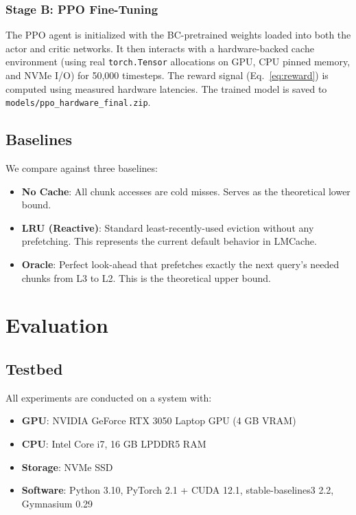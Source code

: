\documentclass[conference]{IEEEtran}
\begin{document}
\subsubsection{Stage B: PPO Fine-Tuning}

The PPO agent is initialized with the BC-pretrained weights loaded into both the actor and critic networks. It then interacts with a hardware-backed cache environment (using real \texttt{torch.Tensor} allocations on GPU, CPU pinned memory, and NVMe I/O) for 50,000 timesteps. The reward signal (Eq.~\ref{eq:reward}) is computed using measured hardware latencies. The trained model is saved to \texttt{models/ppo\_hardware\_final.zip}.

\subsection{Baselines}

We compare against three baselines:

\begin{itemize}
    \item \textbf{No Cache}: All chunk accesses are cold misses. Serves as the theoretical lower bound.
    \item \textbf{LRU (Reactive)}: Standard least-recently-used eviction without any prefetching. This represents the current default behavior in LMCache.
    \item \textbf{Oracle}: Perfect look-ahead that prefetches exactly the next query's needed chunks from L3 to L2. This is the theoretical upper bound.
\end{itemize}

\section{Evaluation}

\subsection{Testbed}

All experiments are conducted on a system with:
\begin{itemize}
    \item \textbf{GPU}: NVIDIA GeForce RTX 3050 Laptop GPU (4 GB VRAM)
    \item \textbf{CPU}: Intel Core i7, 16 GB LPDDR5 RAM
    \item \textbf{Storage}: NVMe SSD
    \item \textbf{Software}: Python 3.10, PyTorch 2.1 + CUDA 12.1, stable-baselines3 2.2, Gymnasium 0.29
\end{itemize}
\end{document}
